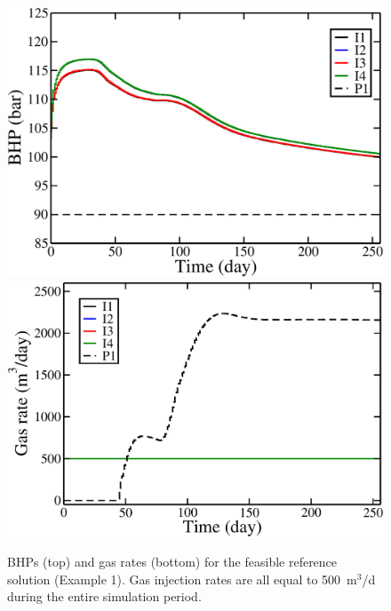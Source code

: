 \documentclass[twocolumn,numbook]{svjour3}          %
\begin{document}
\begin{figure}
\begin{center}
\includegraphics[totalheight=2.2in,angle=0]{ReferenceC500HeuristicItPb_BHP.pdf}
\includegraphics[totalheight=2.17in,angle=0]{ReferenceC500HeuristicItPb_rate_gas.pdf}
\end{center}
\caption{BHPs (top) and gas rates (bottom) for the feasible reference solution (Example 1). 
  Gas injection rates are all equal to 500~m$^3$/d during the entire simulation period. }
\label{fig:PIReferencePlots}
\end{figure}




\end{document}
